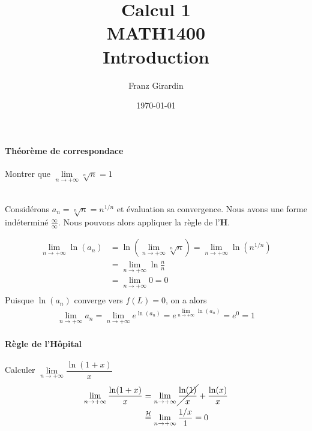 \documentclass{report}
\title{\Huge{Calcul 1}\\{MATH1400}\\{\textbf{Introduction}}}
\author{\huge{Franz Girardin}}
\date{\today}
\begin{document}
\maketitle

\pagebreak

\pagebreak
\begin{multicols*}{2}


  \paragraph{Théorème de correspondace}
  Montrer que $\lim\limits_{n \to+\infty }\sqrt[n]{n}  = 1$ 

  \mbox{}\vspace{1em}\\
  Considérons $a_n = \sqrt[n]{n} = n^{1/n}$ et évaluation sa convergence. 
  Nous avons une forme indéterminé $ \frac{\infty}{\infty} $. Nous pouvons 
  alors appliquer la règle de l'\textbf{H}. 

  \begin{align*}
    \lim\limits_{n \to+\infty } \ln(a_n) 
        &= 
    \ln\left(\lim\limits_{n \to+\infty }\sqrt[n]{n}\right) 
         = 
        \lim\limits_{n\to+\infty} \ln(n^{1/n}) \\ 
        &=        
        \lim\limits_{n \to+\infty } \ln \frac{n}{n} \\ 
        &= 
        \lim\limits_{n \to+\infty } 0 = 0  \\ 
  \end{align*}
  Puisque $\ln(a_n)$  converge vers $f(L) = 0$, on a alors 
  \begin{align*}
   \lim\limits_{n\to+\infty }a_n 
   = 
   \lim\limits_{n \to+\infty}e^{\ln(a_n)}               
   = 
   e^{\lim\limits_{n \to+\infty }\ln(a_n)}  =  e^0 = 1
  \end{align*}

  \paragraph{Règle de l'Hôpital}
  Calculer $\lim\limits_{n \to+\infty }\dfrac{\ln(1+x)}{x} $    
  \mbox{}\vspace{1em}\\


  \begin{align*}
    \lim\limits_{n \to+\infty }\dfrac{\ln(1+x)}{x} 
    &= \lim\limits_{n \to+\infty }\cancel{\frac{\ln(1)}{x}} + \frac{\ln(x)}{x}    \\ 
    &\overset{\mathcal{H}}{=} 
  \lim\limits_{n\to+\infty } \frac{1/x}{1} = 0
  \end{align*}



\end{multicols*}
\end{document}
